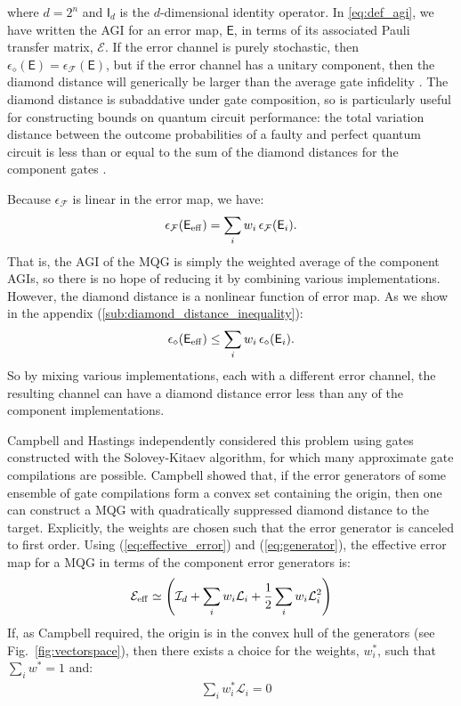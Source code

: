 \documentclass[aps,nofootinbib,pra,notitlepage,twocolumn]{revtex4-1}
\newcommand{\error}{\ensuremath{{\mathsf{E}}}}
\begin{document}
where $d=2^n$ and $\mathsf{I}_d$ is the $d$-dimensional identity operator.  In \ref{eq:def_agi}, we have written the AGI for an error map, $\mathsf{E}$, in terms of its associated Pauli transfer matrix, $\mathcal{E}$. If the error channel is purely stochastic, then $\epsilon_\diamond(\error) = \epsilon_\mathcal{F}(\error)$, but if the error channel has a unitary component, then the diamond distance will generically be larger than the average gate infidelity \cite{1511.00727}. The diamond distance is subaddative \cite{watrous2018theory} under gate composition, so is particularly useful for constructing bounds on quantum circuit performance: the total variation distance between the outcome probabilities of a faulty and perfect quantum circuit is less than or equal to the sum of the diamond distances for the component gates \cite{aharonov1998quantum}. 

Because $\epsilon_{\mathcal{F}}$ is linear in the error map, we have:
\begin{equation}
	\epsilon_{\mathcal{F}}\!\left(\mathsf{E}_{\rm eff}\right) = \sum_i w_i \,\epsilon_{\mathcal{F}}(\mathsf{E}_i).
\end{equation}
That is, the AGI of the MQG is simply the weighted average of the component AGIs, so there is no hope of reducing it by combining various implementations. However, the diamond distance is a nonlinear function of error map. As we show in the appendix (\ref{sub:diamond_distance_inequality}):
\begin{equation}
	\label{eq:diamond_ineq}
	\epsilon_\diamond\!\left(\mathsf{E}_{\rm eff}\right) \le \sum_i w_i \, \epsilon_\diamond(\mathsf{E}_i).
\end{equation}
So by mixing various implementations, each with a different error channel, the resulting channel can have a diamond distance error less than any of the component implementations. 

Campbell \cite{Campbell2017} and Hastings \cite{1612.01011} independently considered this problem using gates constructed with the Solovey-Kitaev algorithm, for which many approximate gate compilations are possible. Campbell showed that, if the error generators of some ensemble of gate compilations form a convex set containing the origin, then one can construct a MQG with quadratically suppressed diamond distance to the target. Explicitly, the weights are chosen such that the error generator is canceled to first order. Using (\ref{eq:effective_error}) and (\ref{eq:generator}), the effective error map for a MQG in terms of the component error generators is:
\begin{align}
	\label{eq:generators_and_effective_error}
	\mathcal{E}_{\rm eff} \simeq \left(\mathcal{I}_d + \sum_i w_i \mathcal{L}_i + \frac{1}{2} \sum_i w_i \mathcal{L}_i^2\right)
\end{align}
If, as Campbell required, the origin is in the convex hull of the generators (see Fig.~\ref{fig:vectorspace}), then there exists a choice for the weights, $w_i^*$, such that $\sum_i w^*=1$ and:
\begin{align}
	\label{eq:cancel}
	&\sum_i w_i^* \mathcal{L}_i= 0
\end{align}
\end{document}
